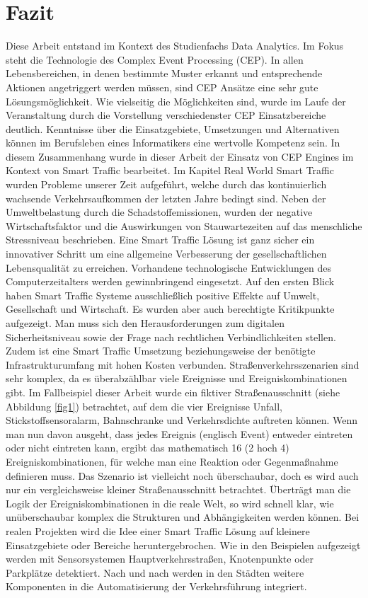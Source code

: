 \section{Fazit}

Diese Arbeit entstand im Kontext des Studienfachs Data Analytics. Im Fokus steht die Technologie des Complex Event Processing (CEP). In allen Lebensbereichen, in denen bestimmte Muster erkannt und entsprechende Aktionen angetriggert werden müssen, sind CEP Ansätze eine sehr gute Lösungsmöglichkeit. Wie vielseitig die Möglichkeiten sind, wurde im Laufe der Veranstaltung durch die Vorstellung verschiedenster CEP Einsatzbereiche deutlich. Kenntnisse über die Einsatzgebiete, Umsetzungen und Alternativen können im Berufsleben eines Informatikers eine wertvolle Kompetenz sein. In diesem Zusammenhang wurde in dieser Arbeit der Einsatz von CEP Engines im Kontext von Smart Traffic bearbeitet.
Im Kapitel Real World Smart Traffic wurden Probleme unserer Zeit aufgeführt, welche durch das kontinuierlich wachsende Verkehrsaufkommen der letzten Jahre bedingt sind. Neben der Umweltbelastung durch die Schadstoffemissionen, wurden der negative Wirtschaftsfaktor und die Auswirkungen von Stauwartezeiten auf das menschliche Stressniveau beschrieben. Eine Smart Traffic Lösung ist ganz sicher ein innovativer Schritt um eine allgemeine Verbesserung der gesellschaftlichen Lebensqualität zu erreichen. Vorhandene technologische Entwicklungen des Computerzeitalters werden gewinnbringend eingesetzt. Auf den ersten Blick haben Smart Traffic Systeme ausschließlich positive Effekte auf Umwelt, Gesellschaft und Wirtschaft. Es wurden aber auch berechtigte Kritikpunkte aufgezeigt. Man muss sich den Herausforderungen zum digitalen Sicherheitsniveau sowie der Frage nach rechtlichen Verbindlichkeiten stellen. Zudem ist eine Smart Traffic Umsetzung beziehungsweise der benötigte Infrastrukturumfang mit hohen Kosten verbunden. Straßenverkehrsszenarien sind sehr komplex, da es überabzählbar viele Ereignisse und Ereigniskombinationen gibt. Im Fallbeispiel dieser Arbeit wurde ein fiktiver Straßenausschnitt (siehe Abbildung \ref{fig1}) betrachtet, auf dem die vier Ereignisse Unfall, Stickstoffsensoralarm, Bahnschranke und Verkehrsdichte auftreten können. Wenn man nun davon ausgeht, dass jedes Ereignis (englisch Event) entweder eintreten oder nicht eintreten kann, ergibt das mathematisch 16 (2 hoch 4) Ereigniskombinationen, für welche man eine Reaktion oder Gegenmaßnahme definieren muss. Das Szenario ist vielleicht noch überschaubar, doch es wird auch nur ein vergleichsweise kleiner Straßenausschnitt betrachtet. Überträgt man die Logik der Ereigniskombinationen in die reale Welt, so wird schnell klar, wie unüberschaubar komplex die Strukturen und Abhängigkeiten werden können. Bei realen Projekten wird die Idee einer Smart Traffic Lösung auf kleinere Einsatzgebiete oder Bereiche heruntergebrochen. Wie in den Beispielen aufgezeigt werden mit Sensorsystemen Hauptverkehrsstraßen, Knotenpunkte oder Parkplätze detektiert. Nach und nach werden in den Städten weitere Komponenten in die Automatisierung der Verkehrsführung integriert.
